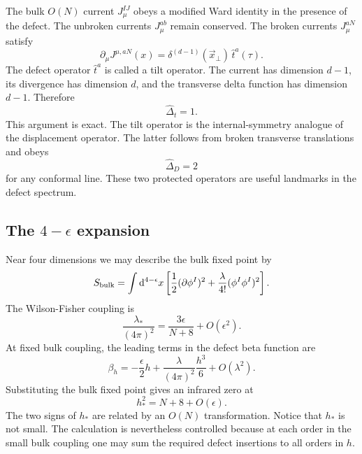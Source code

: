 \documentclass[11pt]{article}
\newcommand{\dd}{\mathrm{d}}
\begin{document}
The bulk $O(N)$ current $J_\mu^{IJ}$ obeys a modified Ward identity in the presence of the defect.  The unbroken currents $J_\mu^{ab}$ remain conserved.  The broken currents $J_\mu^{aN}$ satisfy
\begin{equation}
  \partial_\mu J^{\mu,aN}(x)
  =\delta^{(d-1)}(\vec x_\perp)\,\widehat t^a(\tau) .
  \label{eq:tiltward}
\end{equation}
The defect operator $\widehat t^a$ is called a tilt operator.  The current has
dimension $d-1$, its divergence has dimension $d$, and the transverse delta
function has dimension $d-1$.  Therefore
\begin{equation}
  \widehat\Delta_t=1 .
\end{equation}
This argument is exact.  The tilt operator is the internal-symmetry analogue
of the displacement operator.  The latter follows from broken transverse
translations and obeys
\begin{equation}
  \widehat\Delta_D=2
\end{equation}
for any conformal line.  These two protected operators are useful landmarks in
the defect spectrum.

\subsection{The \texorpdfstring{$4-\epsilon$}{4-epsilon} expansion}

Near four dimensions we may describe the bulk fixed point by
\begin{equation}
  S_{\rm bulk}=\int \dd^{4-\epsilon}x\left[
  \frac12(\partial\phi^I)^2
  +\frac{\lambda}{4!}(\phi^I\phi^I)^2\right] .
\end{equation}
The Wilson-Fisher coupling is
\begin{equation}
  \frac{\lambda_*}{(4\pi)^2}
  =\frac{3\epsilon}{N+8}+O(\epsilon^2) .
\end{equation}
At fixed bulk coupling, the leading terms in the defect beta function are
\begin{equation}
  \beta_h=-\frac{\epsilon}{2}h
  +\frac{\lambda}{(4\pi)^2}\frac{h^3}{6}
  +O(\lambda^2) .
  \label{eq:pinningbetah}
\end{equation}
Substituting the bulk fixed point gives an infrared zero at
\begin{equation}
  h_*^2=N+8+O(\epsilon) .
\end{equation}
The two signs of $h_*$ are related by an $O(N)$ transformation.  Notice that
$h_*$ is not small.  The calculation is nevertheless controlled because at
each order in the small bulk coupling one may sum the required defect
insertions to all orders in $h$.
\end{document}
